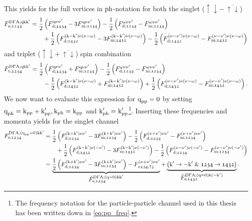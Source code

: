 \documentclass[\main/main.tex]{subfiles}
\begin{document}
This yields for the full vertices in $\text{ph}$-notation for both the singlet ($\uparrow\downarrow-\,\overline{\uparrow\downarrow}$)
\begin{align}
\begin{split}
	F_{\text{s};\mathfrak{1234}}^{\text{D}\Gamma\text{A};\text{q}\text{k}\text{k}'}&=\frac12\left (F_{\text{d};\mathfrak{1234}}^{\text{q}\nu\nu'}-3F_{\text{m};\mathfrak{1234}}^{\text{q}\nu\nu'}\right )-\frac12\left (F_{\text{d};\mathfrak{1234}}^{\omega\nu\nu'}-F_{\text{m};\mathfrak{1234}}^{\omega\nu\nu'}\right )\\
	&\qquad+\frac12\left (F_{\text{d};\mathfrak{1432}}^{(\text{k}-\text{k}')\nu(\nu-\omega)}-3F_{\text{m};\mathfrak{1432}}^{(\text{k}-\text{k}')\nu(\nu-\omega)}\right )-\frac12\left (F_{\text{d};\mathfrak{1432}}^{(\nu-\nu')\nu(\nu-\omega)}-F_{\text{m};\mathfrak{1432}}^{(\nu-\nu')\nu(\nu-\omega)}\right )
\end{split}
\end{align}
and triplet ($\uparrow\downarrow+\,\overline{\uparrow\downarrow}$) spin combination
\begin{align}
\begin{split}
	F_{\text{t};\mathfrak{1234}}^{\text{D}\Gamma\text{A};\text{q}\text{k}\text{k}'}&=\frac12\left (F_{\text{d};\mathfrak{1234}}^{\text{q}\nu\nu'}+F_{\text{m};\mathfrak{1234}}^{\text{q}\nu\nu'}\right )-\frac12\left (F_{\text{d};\mathfrak{1234}}^{\omega\nu\nu'}-F_{\text{m};\mathfrak{1234}}^{\omega\nu\nu'}\right )\\
	&\qquad-\frac12\left (F_{\text{d};\mathfrak{1432}}^{(\text{k}-\text{k}')\nu(\nu-\omega)}+F_{\text{m};\mathfrak{1432}}^{(\text{k}-\text{k}')\nu(\nu-\omega)}\right )+\frac12\left (F_{\text{d};\mathfrak{1432}}^{(\nu-\nu')\nu(\nu-\omega)}-F_{\text{m};\mathfrak{1432}}^{(\nu-\nu')\nu(\nu-\omega)}\right ).
\end{split}
\end{align}
We now want to evaluate this expression for $\text{q}_{\text{pp}}=0$ by setting $\text{q}_{\text{ph}}=\text{k}_{\text{pp}}+\text{k}'_{\text{pp}}, \text{k}_{\text{ph}}=\text{k}_{\text{pp}}$ and $\text{k}'_{\text{ph}}=\text{k}'_{\text{pp}}$\footnote{The frequency notation for the particle-particle channel used in this thesis has been written down in \eqref{eq:pp_freq}.}. Inserting these frequencies and momenta yields for the singlet channel
\begin{align}\label{eq:ladder_f_sing}
\begin{split}
	F_{\text{s};\mathfrak{1234}}^{\text{D}\Gamma\text{A};(\text{q}_{\text{pp}}=0)\text{k}\text{k}'}&=\frac12\left (F_{\text{d};\mathfrak{1234}}^{(\text{k}+\text{k}')\nu\nu'}-3F_{\text{m};\mathfrak{1234}}^{(\text{k}+\text{k}')\nu\nu'}\right )-\frac12\left (F_{\text{d};\mathfrak{1234}}^{(\nu+\nu')\nu\nu'}-F_{\text{m};\mathfrak{1234}}^{(\nu+\nu')\nu\nu'}\right )\\
	&\qquad+\frac12\left (F_{\text{d};\mathfrak{1432}}^{(\text{k}-\text{k}')\nu(-\nu')}-3F_{\text{m};\mathfrak{1432}}^{(\text{k}-\text{k}')\nu(-\nu')}\right )-\frac12\left (F_{\text{d};\mathfrak{1234}}^{(\nu-\nu')\nu(-\nu')}-F_{\text{m};\mathfrak{1234}}^{(\nu-\nu')\nu(-\nu')}\right )\\
	&=\underbrace{\frac12\left (F_{\text{d};\mathfrak{1234}}^{(\text{k}+\text{k}')\nu\nu'}-3F_{\text{m};\mathfrak{1234}}^{(\text{k}+\text{k}')\nu\nu'}\right )-F_{\mathfrak{1234};\uparrow\downarrow}^{(\nu+\nu')\nu\nu'}}_{\textstyle\tilde{F}_{\text{s};\mathfrak{1234}}^{\text{D}\Gamma\text{A};(\text{q}=0)\text{k}\text{k}'}}+ \underbrace{\left (\text{k}'\rightarrow -\text{k}'\;\&\; \mathfrak{1234}\rightarrow\mathfrak{1432}\right )}_{\textstyle\tilde{F}_{\text{s};\mathfrak{1432}}^{\text{D}\Gamma\text{A};(\text{q}=0)\text{k}(-\text{k}')}}.
\end{split}
\end{align}
\end{document}
